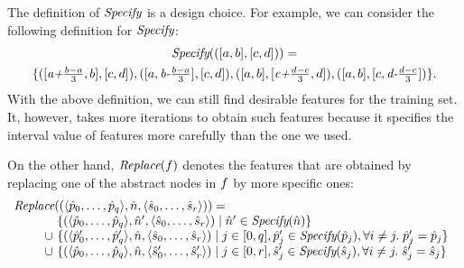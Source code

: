 The definition of ${\textit{Specify}}$ is a design choice.
For example, we can consider the following definition for ${\textit{Specify}}$:
\begin{multline*}
{\textit{Specify}}(([a,b],[c,d])) = \\
\{ 
([\mbox{{\it a+$\frac{b-a}{3}$}},b ],[c,d]),
([a,\mbox{{\it b-$\frac{b-a}{3}$}}],[c,d]),
([a,b],[\mbox{{\it c+$\frac{d-c}{3}$}},d ]),
([a,b],[c,\mbox{{\it d-$\frac{d-c}{3}$}} ])
 \}.
\end{multline*}
With the above definition, we can still find desirable features for the training set.
It, however, takes more iterations to obtain such features because it specifies the interval value of features more carefully than the one we used.

On the other hand, ${\textit{Replace}}(f)$ denotes the features that are obtained by replacing one of the abstract nodes in $f$ by more specific ones:
\[
\begin{array}{l}
\Replace((\seq{\myhat{p}_0,\dots,\myhat{p}_q}, \myhat{n}, \seq{\myhat{s}_0,\dots,\myhat{s}_r})) =\\
\qquad
\begin{array}{l@{~}l}
& \myset{(\seq{ \myhat{p}_0,\dots,\myhat{p}_q}, \myhat{n}', \seq{\myhat{s}_0,\dots,\myhat{s}_r}) \mid \myhat{n}' \in \Specify(\myhat{n}) } \\
 \cup&\myset{(\seq{ \myhat{p}'_0,\dots,\myhat{p}'_q}, \myhat{n}, \seq{\myhat{s}_0,\dots,\myhat{s}_r}) \mid
j \in [0,q], \myhat{p}'_j \in \Specify(\myhat{p}_j), \forall i \not= j.\; \myhat{p}'_j = \myhat{p}_j} \\
\cup & \myset{(\seq{ \myhat{p}_0,\dots,\myhat{p}_q}, \myhat{n}, \seq{\myhat{s}'_0,\dots,\myhat{s}'_r}) \mid
j \in [0,r], \myhat{s}'_j \in \Specify(\myhat{s}_j), \forall i \not= j.\; \myhat{s}'_j = \myhat{s}_j}
\end{array}
\end{array}
\]

